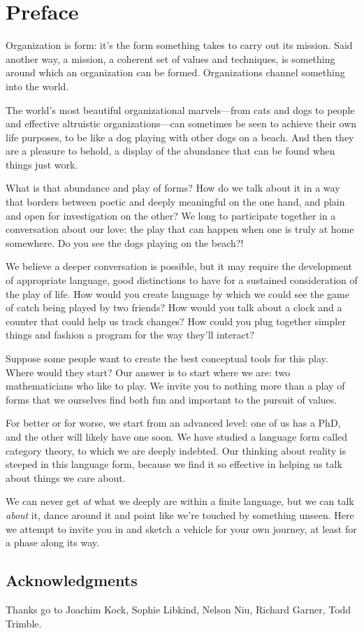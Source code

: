 \documentclass[DynamicalBook]{subfiles}
\begin{document}
%


\setcounter{chapter}{0}%


\chapter{Preface}\label{chapter.0}

Organization is form: it's the form something takes to carry out its mission. Said another way, a mission, a coherent set of values and techniques, is something around which an organization can be formed. Organizations channel something into the world.

 The world's most beautiful organizational marvels---from cats and dogs to people and effective altruistic organizations---can sometimes be seen to achieve their own life purposes, to be like a dog playing with other dogs on a beach. And then they are a pleasure to behold, a display of the abundance that can be found when things just work.

What is that abundance and play of forms? How do we talk about it in a way that borders between poetic and deeply meaningful on the one hand, and plain and open for investigation on the other? We long to participate together in a conversation about our love: the play that can happen when one is truly at home somewhere. Do you see the dogs playing on the beach?!

We believe a deeper conversation is possible, but it may require the development of appropriate language, good distinctions to have for a sustained consideration of the play of life. How would you create language by which we could see the game of catch being played by two friends? How would you talk about a clock and a counter that could help us track changes? How could you  plug together simpler things and fashion a program for the way they'll interact?

Suppose some people want to create the best conceptual tools for this play. Where would they start? Our answer is to start where we are: two mathematicians who like to play. We invite you to nothing more than a play of forms that we ourselves find both fun and important to the pursuit of  values.

For better or for worse, we start from an advanced level: one of us has a PhD, and the other will likely have one soon. We have studied a language form called category theory, to which we are deeply indebted. Our thinking about reality is steeped in this language form, because we find it so effective in helping us talk about things we care about.

We can never get \emph{at} what we deeply are within a finite language, but we can talk \emph{about} it, dance around it and point like we're touched by something unseen. Here we attempt to invite you in and sketch a vehicle for your own journey, at least for a phase along its way. 


\section*{Acknowledgments}

Thanks go to Joachim Kock, Sophie Libkind, Nelson Niu, Richard Garner, Todd Trimble.
\end{document}
